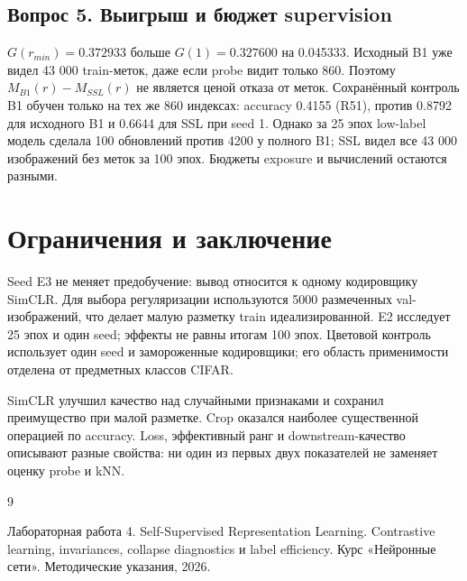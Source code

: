 \subsection*{Вопрос 5. Выигрыш и бюджет supervision}
$G(r_{min})=0.372933$ больше $G(1)=0.327600$ на 0.045333. Исходный B1 уже видел 43 000 train-меток, даже если probe видит только 860. Поэтому $M_{B1}(r)-M_{SSL}(r)$ не является ценой отказа от меток. Сохранённый контроль B1 обучен только на тех же 860 индексах: accuracy 0.4155 (R51), против 0.8792 для исходного B1 и 0.6644 для SSL при seed 1. Однако за 25 эпох low-label модель сделала 100 обновлений против 4200 у полного B1; SSL видел все 43 000 изображений без меток за 100 эпох. Бюджеты exposure и вычислений остаются разными.

\section{Ограничения и заключение}
Seed E3 не меняет предобучение: вывод относится к одному кодировщику SimCLR. Для выбора регуляризации используются 5000 размеченных val-изображений, что делает малую разметку train идеализированной. E2 исследует 25 эпох и один seed; эффекты не равны итогам 100 эпох. Цветовой контроль использует один seed и замороженные кодировщики; его область применимости отделена от предметных классов CIFAR.

SimCLR улучшил качество над случайными признаками и сохранил преимущество при малой разметке. Crop оказался наиболее существенной операцией по accuracy. Loss, эффективный ранг и downstream-качество описывают разные свойства: ни один из первых двух показателей не заменяет оценку probe и kNN.
\clearpage
\renewcommand{\refname}{Список использованных источников}
\begin{thebibliography}{9}
 Лабораторная работа 4. Self-Supervised Representation Learning. Contrastive learning, invariances, collapse diagnostics и label efficiency. Курс «Нейронные сети». Методические указания, 2026.
\end{thebibliography}
\clearpage
